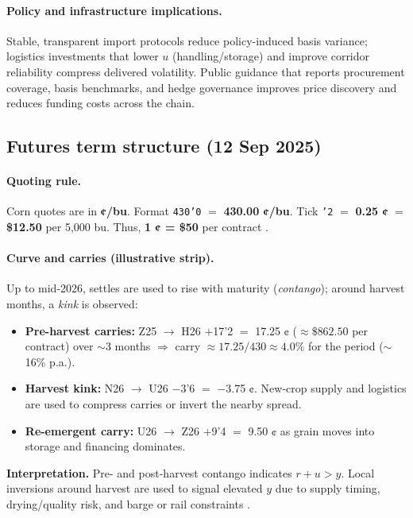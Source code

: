 \documentclass[10pt,a4paper]{article} %
\begin{document}
\paragraph{Policy and infrastructure implications.}
Stable, transparent import protocols reduce policy-induced basis variance; logistics investments that lower \(u\) (handling/storage) and improve corridor reliability compress delivered volatility. Public guidance that reports procurement coverage, basis benchmarks, and hedge governance improves price discovery and reduces funding costs across the chain.


\subsection{Futures term structure (12 Sep 2025)}
\paragraph{Quoting rule.} Corn quotes are in \textbf{¢/bu}. Format \texttt{430'0} \(=\) \textbf{430.00 ¢/bu}. Tick \texttt{'2} \(=\) \textbf{0.25 ¢} \(=\) \textbf{\$12.50} per 5,000 bu. Thus, \textbf{1 ¢ = \$50} per contract \citep{barchart_zc_specs}.

\paragraph{Curve and carries (illustrative strip).}
Up to mid-2026, settles are used to rise with maturity (\emph{contango}); around harvest months, a \emph{kink} is observed:
\begin{itemize}
  \item \textbf{Pre-harvest carries:} Z25 \(\to\) H26 \(+\)17'2 \(=\) 17.25 ¢ (\(\approx\$862.50\) per contract) over \(\sim\)3 months \(\Rightarrow\) carry \(\approx 17.25/430\approx 4.0\%\) for the period (\(\sim\)16\% p.a.).
  \item \textbf{Harvest kink:} N26 \(\to\) U26 \(-\)3'6 \(=\) \(-\)3.75 ¢. New-crop supply and logistics are used to compress carries or invert the nearby spread.
  \item \textbf{Re-emergent carry:} U26 \(\to\) Z26 \(+\)9'4 \(=\) 9.50 ¢ as grain moves into storage and financing dominates.
\end{itemize}
\textbf{Interpretation.} Pre- and post-harvest contango indicates \(r+u>y\). Local inversions around harvest are used to signal elevated \(y\) due to supply timing, drying/quality risk, and barge or rail constraints \citep{ams_gtr_2023,ncga_storage_2025}.
\end{document}

